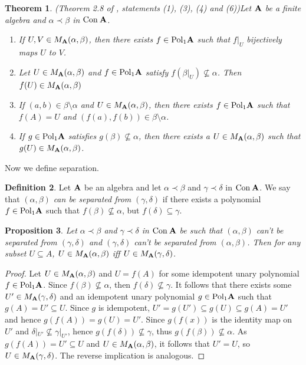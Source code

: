 \documentclass[11pt]{amsart}
\newcommand{\m}[1]{{\uppercase {\mathbf {#1}}}}
\newcommand{\poln}[2]{{\rm Pol_{#1}\m #2}}
\newcommand{\con}{{\rm Con\:}}
\newcommand{\cn}[1]{{\con\m {#1}}}
\newtheorem{thm}{Theorem}[section]
\newtheorem{prp}[thm]{Proposition}
\theoremstyle{definition}
\newtheorem{df}[thm]{Definition}
\begin{document}
\begin{thm}{\rm (Theorem 2.8 of \cite{tct}, statements (1), (3), (4) and (6))}\label{TCTfund}
Let $\m a$ be a finite algebra and $\alpha\prec\beta$ in $\cn a$. 
\begin{enumerate}
\item If $U,V\in M_{\m a}(\alpha,\beta)$, then there exists $f\in \poln{1}{a}$ such that $f|_U$ bijectively maps $U$ to $V$.
\item Let $U\in M_{\m a}(\alpha,\beta)$ and $f\in\poln{1}{a}$ satisfy $f(\beta|_U)\nsubseteq\alpha$. Then $f(U)\in M_{\m a}(\alpha,\beta)$
\item If $(a,b)\in\beta\setminus\alpha$ and $U\in M_{\m a}(\alpha,\beta)$, then there exists $f\in\poln{1}{a}$ such that $f(A)=U$ and $(f(a),f(b))\in\beta\setminus\alpha$.
\item If $g\in\poln{1}{a}$ satisfies $g(\beta)\nsubseteq\alpha$, then there exists a $U\in M_{\m a}(\alpha,\beta)$ such that $g(U)\in M_{\m a}(\alpha,\beta)$.
\end{enumerate}
\end{thm}

Now we define separation.

\begin{df}\label{sep1}
Let $\m a$ be an algebra and let $\alpha\prec\beta$ and $\gamma\prec\delta$ in $\cn a$. We say that $(\alpha,\beta)$ {\em can be separated from} $(\gamma,\delta)$ if there exists a polynomial $f\in \mathrm{Pol}_1\m a$ such that $f(\beta)\nsubseteq\alpha$, but $f(\delta)\subseteq\gamma$.
\end{df}

\begin{prp}\label{minsetsarethesame}
Let $\alpha\prec\beta$ and $\gamma\prec\delta$ in $\cn A$ be such that $(\alpha,\beta)$ can't be separated from $(\gamma,\delta)$ and $(\gamma,\delta)$ can't be separated from $(\alpha,\beta)$. Then for any subset $U\subseteq A$, $U\in M_{\m a}(\alpha,\beta)$ iff $U\in M_{\m a}(\gamma,\delta)$.
\end{prp}

\begin{proof}
Let $U\in M_{\m a}(\alpha,\beta)$ and $U=f(A)$ for some idempotent unary polynomial $f\in\poln{1}{a}$. Since $f(\beta)\nsubseteq \alpha$, then $f(\delta)\nsubseteq\gamma$. It follows that there exists some $U'\in M_{\m a}(\gamma,\delta)$ and an idempotent unary polynomial $g\in\poln{1}{a}$ such that $g(A)=U'\subseteq U$. Since $g$ is idempotent, $U'=g(U')\subseteq g(U)\subseteq g(A)=U'$ and hence $g(f(A))=g(U)=U'$. Since $g(f(x))$ is the identity map on $U'$ and $\delta|_{U'}\nsubseteq\gamma|_{U'}$, hence $g(f(\delta))\nsubseteq\gamma$, thus $g(f(\beta))\nsubseteq\alpha$. As $g(f(A))=U'\subseteq U$ and $U\in M_{\m a}(\alpha,\beta)$, it follows that $U'=U$, so $U\in M_{\m a}(\gamma,\delta)$. The reverse implication is analogous.
\end{proof}
\end{document}

